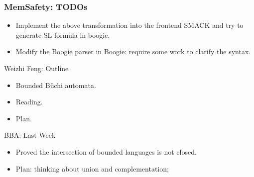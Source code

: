 \documentclass[aspectratio=1610, 13pt]{beamer}
\newcommand{\buchi}{B\"uchi }
\begin{document}
\begin{frame}\frametitle{MemSafety: TODOs}

\begin{itemize}
\item Implement the above transformation into the frontend SMACK and try to generate SL formula in boogie.

\item Modify the Boogie parser in Boogie: require some work to clarify the syntax.

\end{itemize}
\end{frame}
\begin{frame}{Weizhi Feng: Outline}
    \begin{itemize}
        \item  Bounded \buchi automata.
        
        \item Reading.
        \item Plan.
    \end{itemize}
    
\end{frame}

\begin{frame}{BBA: Last Week}
    
\begin{itemize}
    \item Proved the intersection of bounded languages is not closed.
    \item Plan: thinking about union and complementation;
\end{itemize}

\end{frame}
\end{document}
